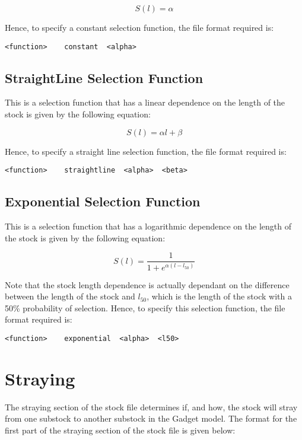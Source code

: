 \documentclass[10pt,twoside]{book}
\begin{document}
\begin{equation}\label{eq:constsel}
S(l) = \alpha
\end{equation}

Hence, to specify a constant selection function, the file format required is:

{\small\begin{verbatim}
<function>    constant  <alpha>
\end{verbatim}}

\subsection{StraightLine Selection Function}
This is a selection function that has a linear dependence on the length of the stock is given by the following equation:

\begin{equation}\label{eq:straightsel}
S(l) = \alpha l + \beta
\end{equation}

\bigskip
Hence, to specify a straight line selection function, the file format required is:

{\small\begin{verbatim}
<function>    straightline  <alpha>  <beta>
\end{verbatim}}

\subsection{Exponential Selection Function}
This is a selection function that has a logarithmic dependence on the length of the stock is given by the following equation:

\begin{equation}\label{eq:expsel}
S(l) = \frac{1}{1 + e^{ \alpha (l - l_{50})}}
\end{equation}

\bigskip
Note that the stock length dependence is actually dependant on the difference between the length of the stock and $l_{50}$, which is the length of the stock with a 50\% probability of selection.  Hence, to specify this selection function, the file format required is:

{\small\begin{verbatim}
<function>    exponential  <alpha>  <l50>
\end{verbatim}}

\section{Straying}\label{sec:stockstray}
The straying section of the stock file determines if, and how, the stock will stray from one substock to another substock in the Gadget model.  The format for the first part of the straying section of the stock file is given below:
\end{document}

